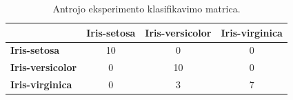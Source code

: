 \begin{table}[H]
    \centering
    \caption{Antrojo eksperimento klasifikavimo matrica.}
    \begin{tabular}{|l|c|c|c|}
        \hline
        & \textbf{Iris-setosa} & \textbf{Iris-versicolor} & \textbf{Iris-virginica} \\
        \hline
        \textbf{Iris-setosa} & 10 & 0 & 0 \\ \hline
        \textbf{Iris-versicolor} & 0 & 10 & 0 \\ \hline
        \textbf{Iris-virginica} & 0 & 3 & 7 \\ \hline
    \end{tabular}
    \label{tab:eksperimento_nr_2_klasifikavimo_matrica}
\end{table}